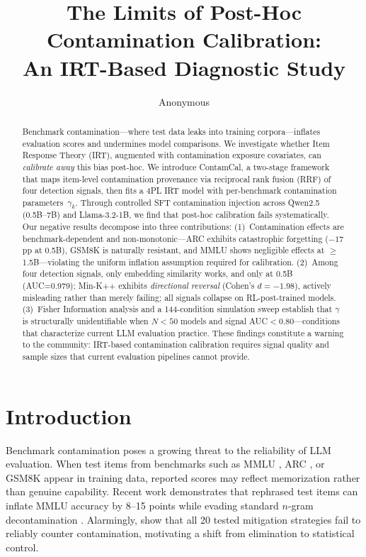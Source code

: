 \documentclass[11pt,a4paper]{article}
\title{The Limits of Post-Hoc Contamination Calibration:\\An IRT-Based Diagnostic Study}
\author{Anonymous}
\begin{document}
\maketitle

\begin{abstract}
Benchmark contamination---where test data leaks into training corpora---inflates evaluation scores and undermines model comparisons.
We investigate whether Item Response Theory (IRT), augmented with contamination exposure covariates, can \emph{calibrate away} this bias post-hoc.
We introduce ContamCal, a two-stage framework that maps item-level contamination provenance via reciprocal rank fusion (RRF) of four detection signals, then fits a 4PL IRT model with per-benchmark contamination parameters~$\gamma_k$.
Through controlled SFT contamination injection across Qwen2.5 (0.5B--7B) and Llama-3.2-1B, we find that post-hoc calibration fails systematically.
Our negative results decompose into three contributions:
(1)~Contamination effects are benchmark-dependent and non-monotonic---ARC exhibits catastrophic forgetting ($-17$pp at 0.5B), GSM8K is naturally resistant, and MMLU shows negligible effects at $\geq$1.5B---violating the uniform inflation assumption required for calibration.
(2)~Among four detection signals, only embedding similarity works, and only at 0.5B (AUC=0.979); Min-K++ exhibits \emph{directional reversal} (Cohen's $d=-1.98$), actively misleading rather than merely failing; all signals collapse on RL-post-trained models.
(3)~Fisher Information analysis and a 144-condition simulation sweep establish that $\gamma$ is structurally unidentifiable when $N<50$ models and signal AUC$<0.80$---conditions that characterize current LLM evaluation practice.
These findings constitute a warning to the community: IRT-based contamination calibration requires signal quality and sample sizes that current evaluation pipelines cannot provide.
\end{abstract}

\section{Introduction}
\label{sec:intro}

Benchmark contamination poses a growing threat to the reliability of LLM evaluation.
When test items from benchmarks such as MMLU \cite{hendrycks2021measuring}, ARC \cite{clark2018think}, or GSM8K \cite{cobbe2021gsm8k} appear in training data, reported scores may reflect memorization rather than genuine capability.
Recent work demonstrates that rephrased test items can inflate MMLU accuracy by 8--15 points while evading standard $n$-gram decontamination \cite{yang2023rethinking,golchin2024time}.
Alarmingly, \citet{xu2024benchmark} show that all 20 tested mitigation strategies fail to reliably counter contamination, motivating a shift from elimination to statistical control.
\end{document}
